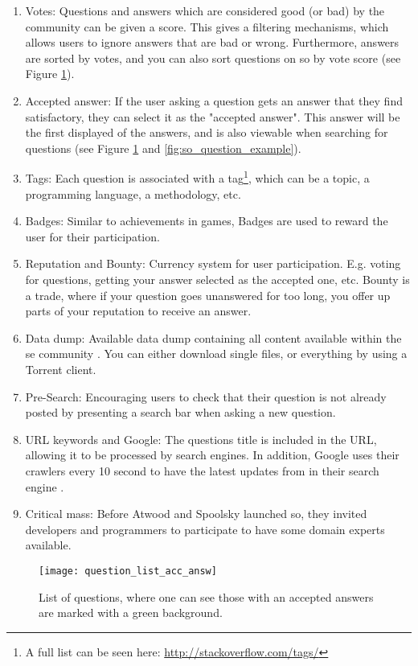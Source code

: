\begin{enumerate}
	\item Votes: Questions and answers which are considered good (or bad) by the community can be given a score. 
	This gives a filtering mechanisms, which allows users to ignore answers that are bad or wrong. 
	Furthermore, answers are sorted by votes, and you can also sort questions on \gls{so} by vote score 
	(see Figure \ref{fig:question_list_acc_answ}). 
	\item Accepted answer: If the user asking a question gets an answer that they find satisfactory, they can select it as the "accepted answer". 
	This answer will be the first displayed of the answers, and is also viewable when searching for questions 
	(see Figure \ref{fig:question_list_acc_answ} and \ref{fig:so_question_example}).
	\item Tags: Each question is associated with a tag\footnote{
		A full list can be seen here: \url{http://stackoverflow.com/tags/}
	}, which can be a topic, a programming language, a methodology, etc.
	\item Badges: Similar to achievements in games, Badges are used to reward the user for their participation.
	\item Reputation and Bounty: Currency system for user participation. 
	E.g. voting for questions, getting your answer selected as the accepted one, etc.
	Bounty is a trade, where if your question goes unanswered for too long, you offer up parts of your reputation to receive an answer.
	\item Data dump: Available data dump containing all content available within the \gls{se} community \cite{StackExchange2016}. 
	You can either download single files, or everything by using a Torrent client.
	\item Pre-Search: Encouraging users to check that their question is not already posted by presenting a search bar when asking a new question. 
	\item URL keywords and Google: The questions title is included in the URL, allowing it to be processed by search engines. 
	In addition, Google uses their crawlers every 10 second to have the latest updates from  in their search engine \cite{Gobry2011}.
	\item Critical mass: Before Atwood and Spoolsky launched \gls{so}, they invited developers and programmers to participate to have some domain experts available. 
\end{enumerate}

\clearpage
\begin{figure}[ht]
	\centering
	\texttt{[image: question\_list\_acc\_answ]}
	\caption{List of questions, where one can see those with an accepted answers are marked with a green background.}
	\label{fig:question_list_acc_answ}
\end{figure}


